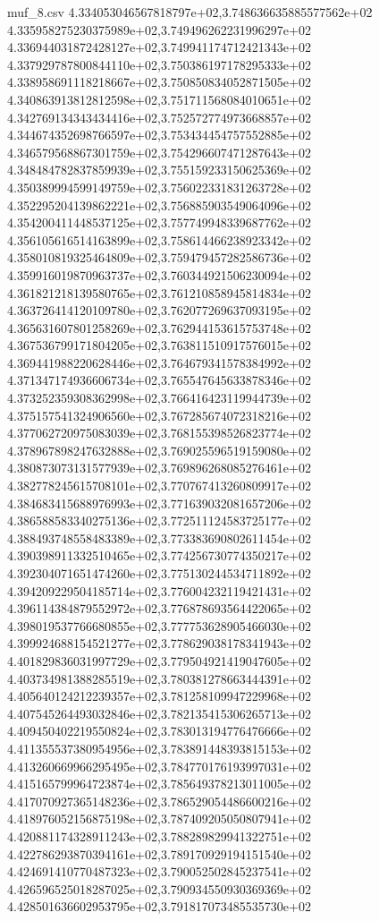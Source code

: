 \begin{filecontents*}{muf_8.csv}
4.334053046567818797e+02,3.748636635885577562e+02
4.335958275230375989e+02,3.749496262231996297e+02
4.336944031872428127e+02,3.749941174712421343e+02
4.337929787800844110e+02,3.750386197178295333e+02
4.338958691118218667e+02,3.750850834052871505e+02
4.340863913812812598e+02,3.751711568084010651e+02
4.342769134343434416e+02,3.752572774973668857e+02
4.344674352698766597e+02,3.753434454757552885e+02
4.346579568867301759e+02,3.754296607471287643e+02
4.348484782837859939e+02,3.755159233150625369e+02
4.350389994599149759e+02,3.756022331831263728e+02
4.352295204139862221e+02,3.756885903549064096e+02
4.354200411448537125e+02,3.757749948339687762e+02
4.356105616514163899e+02,3.758614466238923342e+02
4.358010819325464809e+02,3.759479457282586736e+02
4.359916019870963737e+02,3.760344921506230094e+02
4.361821218139580765e+02,3.761210858945814834e+02
4.363726414120109780e+02,3.762077269637093195e+02
4.365631607801258269e+02,3.762944153615753748e+02
4.367536799171804205e+02,3.763811510917576015e+02
4.369441988220628446e+02,3.764679341578384992e+02
4.371347174936606734e+02,3.765547645633878346e+02
4.373252359308362998e+02,3.766416423119944739e+02
4.375157541324906560e+02,3.767285674072318216e+02
4.377062720975083039e+02,3.768155398526823774e+02
4.378967898247632888e+02,3.769025596519159080e+02
4.380873073131577939e+02,3.769896268085276461e+02
4.382778245615708101e+02,3.770767413260809917e+02
4.384683415688976993e+02,3.771639032081657206e+02
4.386588583340275136e+02,3.772511124583725177e+02
4.388493748558483389e+02,3.773383690802611454e+02
4.390398911332510465e+02,3.774256730774350217e+02
4.392304071651474260e+02,3.775130244534711892e+02
4.394209229504185714e+02,3.776004232119421431e+02
4.396114384879552972e+02,3.776878693564422065e+02
4.398019537766680855e+02,3.777753628905466030e+02
4.399924688154521277e+02,3.778629038178341943e+02
4.401829836031997729e+02,3.779504921419047605e+02
4.403734981388285519e+02,3.780381278663444391e+02
4.405640124212239357e+02,3.781258109947229968e+02
4.407545264493032846e+02,3.782135415306265713e+02
4.409450402219550824e+02,3.783013194776476666e+02
4.411355537380954956e+02,3.783891448393815153e+02
4.413260669966295495e+02,3.784770176193997031e+02
4.415165799964723874e+02,3.785649378213011005e+02
4.417070927365148236e+02,3.786529054486600216e+02
4.418976052156875198e+02,3.787409205050807941e+02
4.420881174328911243e+02,3.788289829941322751e+02
4.422786293870394161e+02,3.789170929194151540e+02
4.424691410770487323e+02,3.790052502845237541e+02
4.426596525018287025e+02,3.790934550930369369e+02
4.428501636602953795e+02,3.791817073485535730e+02

\end{filecontents*}

